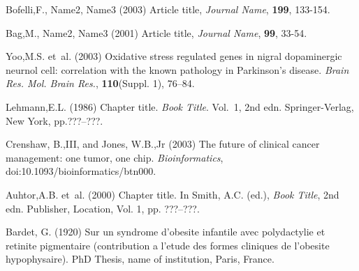 \documentclass{bioinfo}
\begin{document}
%
%
%
%
%
%
%
%
%


\begin{thebibliography}{}
 Bofelli,F., Name2, Name3 (2003) Article title, {\it Journal Name}, {\bf 199}, 133-154.

 Bag,M., Name2, Name3 (2001) Article title, {\it Journal Name}, {\bf 99}, 33-54.

Yoo,M.S. {et~al}. (2003) Oxidative stress regulated genes
in nigral dopaminergic neurnol cell: correlation with the known
pathology in Parkinson's disease. \textit{Brain Res. Mol. Brain
Res.}, \textbf{110}(Suppl. 1), 76--84.

Lehmann,E.L. (1986) Chapter title. \textit{Book Title}. Vol.~1, 2nd edn. Springer-Verlag, New York, pp.???--???.

Crenshaw, B.,III, and Jones, W.B.,Jr (2003) The future of clinical
cancer management: one tumor, one chip. \textit{Bioinformatics},
doi:10.1093/bioinformatics/btn000.

Auhtor,A.B. {et~al}. (2000) Chapter title. In Smith, A.C.
(ed.), \textit{Book Title}, 2nd edn. Publisher, Location, Vol. 1, pp.
???--???.

Bardet, G. (1920) Sur un syndrome d'obesite infantile avec
polydactylie et retinite pigmentaire (contribution a l'etude des
formes cliniques de l'obesite hypophysaire). PhD Thesis, name of
institution, Paris, France.

\end{thebibliography}
\end{document}
